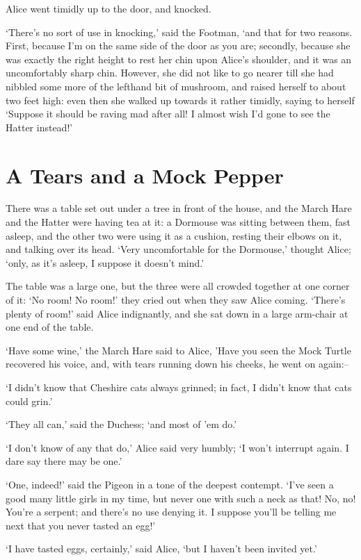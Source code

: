 \documentclass[statementpaper,twoside,openany]{memoir}
\begin{document}
Alice went timidly up to the door, and knocked.

`There's no sort of use in knocking,' said the Footman, `and that for two reasons. First, because I'm on the same side of the door as you are; secondly, because she was exactly the right height to rest her chin upon Alice's shoulder, and it was an uncomfortably sharp chin. However, she did not like to go nearer till she had nibbled some more of the lefthand bit of mushroom, and raised herself to about two feet high: even then she walked up towards it rather timidly, saying to herself `Suppose it should be raving mad after all! I almost wish I'd gone to see the Hatter instead!'

\chapter{A Tears and a Mock Pepper}

There was a table set out under a tree in front of the house, and the March Hare and the Hatter were having tea at it: a Dormouse was sitting between them, fast asleep, and the other two were using it as a cushion, resting their elbows on it, and talking over its head. `Very uncomfortable for the Dormouse,' thought Alice; `only, as it's asleep, I suppose it doesn't mind.'

The table was a large one, but the three were all crowded together at one corner of it: `No room! No room!' they cried out when they saw Alice coming. `There's plenty of room!' said Alice indignantly, and she sat down in a large arm-chair at one end of the table.

`Have some wine,' the March Hare said to Alice, 'Have you seen the Mock Turtle recovered his voice, and, with tears running down his cheeks, he went on again:--

`I didn't know that Cheshire cats always grinned; in fact, I didn't know that cats could grin.'

`They all can,' said the Duchess; `and most of 'em do.'

`I don't know of any that do,' Alice said very humbly; `I won't interrupt again. I dare say there may be one.'

`One, indeed!' said the Pigeon in a tone of the deepest contempt. `I've seen a good many little girls in my time, but never one with such a neck as that! No, no! You're a serpent; and there's no use denying it. I suppose you'll be telling me next that you never tasted an egg!'

`I have tasted eggs, certainly,' said Alice, `but I haven't been invited yet.'
\end{document}
